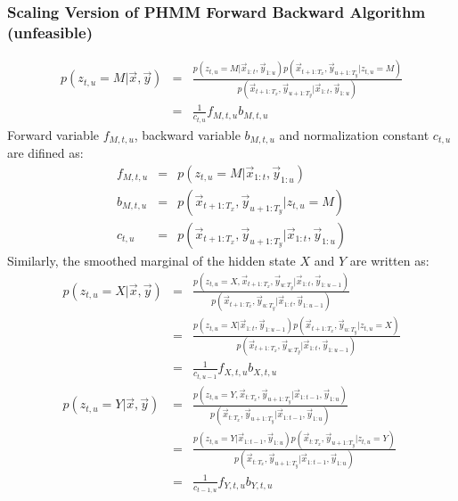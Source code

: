 %
%
\subsubsection{Scaling Version of PHMM Forward Backward Algorithm (unfeasible)}
\begin{eqnarray}
  p(z_{t,u} = M | \vec{x}, \vec{y}) 
                            &=& \frac{ p(z_{t, u}=M | \vec{x}_{1:t}, \vec{y}_{1:u}) p(\vec{x}_{t+1:T_x}, \vec{y}_{u+1:T_y} | z_{t, u}= M) } {p(\vec{x}_{t+1:T_x}, \vec{y}_{u+1:T_y}| \vec{x}_{1:t}, \vec{y}_{1:u})} \nonumber \\
                            &=& \frac{1}{c_{t,u}} f_{M, t, u} b_{M, t, u}
\end{eqnarray}
Forward variable $f_{M, t, u}$, backward variable $b_{M, t, u}$ and normalization constant $c_{t, u}$ are difined as:
\begin{eqnarray}
  f_{M, t, u} &=& p(z_{t, u}=M | \vec{x}_{1:t}, \vec{y}_{1:u}) \\
  b_{M, t, u} &=& p(\vec{x}_{t+1:T_x}, \vec{y}_{u+1:T_y} | z_{t, u}= M) \\
  c_{t, u}    &=& p(\vec{x}_{t+1:T_x}, \vec{y}_{u+1:T_y}| \vec{x}_{1:t}, \vec{y}_{1:u})
\end{eqnarray}
Similarly, the smoothed marginal of the hidden state $X$ and $Y$ are written as:
\begin{eqnarray}
p(z_{t,u} = X | \vec{x}, \vec{y}) &=& \frac{ p(z_{t, u}=X, \vec{x}_{t+1:T_x}, \vec{y}_{u:T_y}| \vec{x}_{1:t}, \vec{y}_{1:u-1}) } {p(\vec{x}_{t+1:T_x}, \vec{y}_{u:T_y}| \vec{x}_{1:t}, \vec{y}_{1:u-1})} \nonumber\\
                            &=& \frac{ p(z_{t, u}=X | \vec{x}_{1:t}, \vec{y}_{1:u-1}) p(\vec{x}_{t+1:T_x}, \vec{y}_{u:T_y} | z_{t, u}= X) } {p(\vec{x}_{t+1:T_x}, \vec{y}_{u:T_y}| \vec{x}_{1:t}, \vec{y}_{1:u-1})} \nonumber \\
                            &=& \frac{1}{c_{t,u-1}} f_{X, t, u} b_{X, t, u} \\
p(z_{t,u} = Y | \vec{x}, \vec{y}) &=& \frac{ p(z_{t, u}=Y, \vec{x}_{t:T_x}, \vec{y}_{u+1:T_y}| \vec{x}_{1:t-1}, \vec{y}_{1:u}) } {p(\vec{x}_{t:T_x}, \vec{y}_{u+1:T_y}| \vec{x}_{1:t-1}, \vec{y}_{1:u})} \nonumber\\
                            &=& \frac{ p(z_{t, u}=Y | \vec{x}_{1:t-1}, \vec{y}_{1:u}) p(\vec{x}_{t:T_x}, \vec{y}_{u+1:T_y} | z_{t, u}= Y) } {p(\vec{x}_{t:T_x}, \vec{y}_{u+1:T_y}| \vec{x}_{1:t-1}, \vec{y}_{1:u})} \nonumber \\
                            &=& \frac{1}{c_{t-1,u}} f_{Y, t, u} b_{Y, t, u}
\end{eqnarray}
